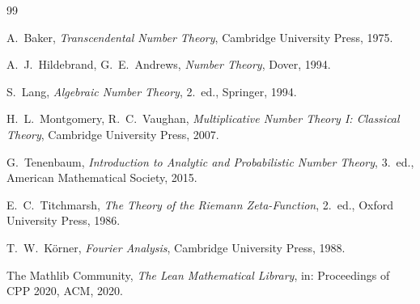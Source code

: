 \documentclass[11pt,a4paper]{article}
\theoremstyle{plain}
\theoremstyle{definition}
\theoremstyle{remark}
\begin{document}
\appendix



\begin{thebibliography}{99}

 A.~Baker, \emph{Transcendental Number Theory},
Cambridge University Press, 1975.

 A.~J.~Hildebrand, G.~E.~Andrews, \emph{Number Theory},
Dover, 1994.

 S.~Lang, \emph{Algebraic Number Theory}, 2.~ed.,
Springer, 1994.

 H.~L.~Montgomery, R.~C.~Vaughan,
\emph{Multiplicative Number Theory I: Classical Theory},
Cambridge University Press, 2007.

 G.~Tenenbaum, \emph{Introduction to Analytic and
Probabilistic Number Theory}, 3.~ed., American Mathematical Society, 2015.

 E.~C.~Titchmarsh, \emph{The Theory of the Riemann
Zeta-Function}, 2.~ed., Oxford University Press, 1986.

 T.~W.~K\"orner, \emph{Fourier Analysis}, Cambridge
University Press, 1988.

 The Mathlib Community, \emph{The Lean Mathematical Library},
in: Proceedings of CPP 2020, ACM, 2020.

\end{thebibliography}
\end{document}
